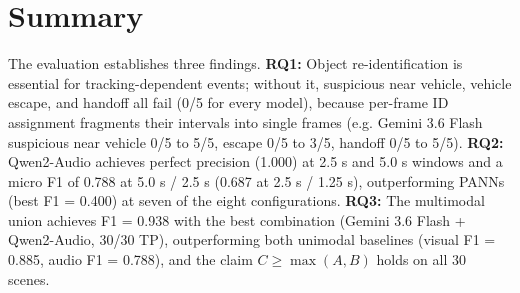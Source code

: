 \section{Summary}
\label{sec:eval-summary}

The evaluation establishes three findings. \textbf{RQ1:} Object re-identification is essential for tracking-dependent events; without it, suspicious near vehicle, vehicle escape, and handoff all fail (0/5 for every model), because per-frame ID assignment fragments their intervals into single frames (e.g. Gemini 3.6 Flash suspicious near vehicle 0/5 to 5/5, escape 0/5 to 3/5, handoff 0/5 to 5/5). \textbf{RQ2:} Qwen2-Audio achieves perfect precision (1.000) at 2.5 s and 5.0 s windows and a micro F1 of 0.788 at 5.0 s / 2.5 s (0.687 at 2.5 s / 1.25 s), outperforming PANNs (best F1 = 0.400) at seven of the eight configurations. \textbf{RQ3:} The multimodal union achieves F1 = 0.938 with the best combination (Gemini 3.6 Flash + Qwen2-Audio, 30/30 TP), outperforming both unimodal baselines (visual F1 = 0.885, audio F1 = 0.788), and the claim $C \ge \max(A, B)$ holds on all 30 scenes.
